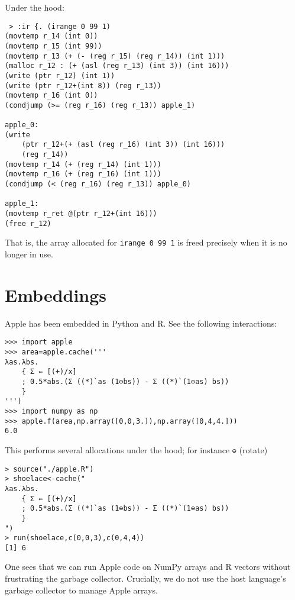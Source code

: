 \documentclass[sigplan,screen]{acmart}
\begin{document}
Under the hood:

\begin{verbatim}
 > :ir {. (irange 0 99 1)
(movtemp r_14 (int 0))
(movtemp r_15 (int 99))
(movtemp r_13 (+ (- (reg r_15) (reg r_14)) (int 1)))
(malloc r_12 : (+ (asl (reg r_13) (int 3)) (int 16)))
(write (ptr r_12) (int 1))
(write (ptr r_12+(int 8)) (reg r_13))
(movtemp r_16 (int 0))
(condjump (>= (reg r_16) (reg r_13)) apple_1)

apple_0:
(write
    (ptr r_12+(+ (asl (reg r_16) (int 3)) (int 16)))
    (reg r_14))
(movtemp r_14 (+ (reg r_14) (int 1)))
(movtemp r_16 (+ (reg r_16) (int 1)))
(condjump (< (reg r_16) (reg r_13)) apple_0)

apple_1:
(movtemp r_ret @(ptr r_12+(int 16)))
(free r_12)
\end{verbatim}

That is, the array allocated for {\tt irange 0 99 1} is freed precisely when it is no longer in use.



\section{Embeddings}

Apple has been embedded in Python and R. See the following interactions:

\begin{verbatim}
>>> import apple
>>> area=apple.cache('''
λas.λbs.
    { Σ ⇐ [(+)/x]
    ; 0.5*abs.(Σ ((*)`as (1⊖bs)) - Σ ((*)`(1⊖as) bs))
    }
''')
>>> import numpy as np
>>> apple.f(area,np.array([0,0,3.]),np.array([0,4,4.]))
6.0
\end{verbatim}

This performs several allocations under the hood; for instance {\tt ⊖} (rotate)

\begin{verbatim}
> source("./apple.R")
> shoelace<-cache("
λas.λbs.
    { Σ ⇐ [(+)/x]
    ; 0.5*abs.(Σ ((*)`as (1⊖bs)) - Σ ((*)`(1⊖as) bs))
    }
")
> run(shoelace,c(0,0,3),c(0,4,4))
[1] 6
\end{verbatim}

One sees that we can run Apple code on NumPy arrays and R vectors without frustrating the garbage collector. Crucially, we do not use the host language's garbage collector to manage Apple arrays.
\end{document}
